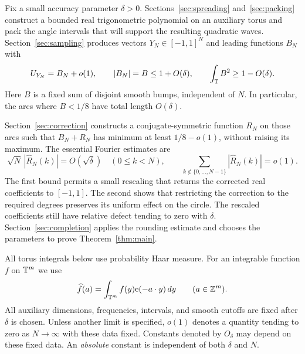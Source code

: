 Fix a small accuracy parameter $\delta>0$. Sections~\ref{sec:spreading}
and~\ref{sec:packing} construct a bounded real trigonometric polynomial
on an auxiliary torus and pack the angle intervals that will support
the resulting quadratic waves. Section~\ref{sec:sampling} produces vectors $Y_N\in[-1,1]^N$ and
leading functions $B_N$ with
\[
 U_{Y_N}=B_N+o(1),\qquad |B_N|=B\le1+O(\delta),\qquad
 \int_{\mathbb T}B^2\ge1-O(\delta).
\]
Here $B$ is a fixed sum of disjoint smooth bumps, independent of
$N$. In particular, the arcs where $B<1/8$ have total length $O(\delta)$.

Section~\ref{sec:correction} constructs a conjugate-symmetric function
$R_N$ on those arcs such that $B_N+R_N$ has minimum at least $1/8-o(1)$,
without raising its maximum. The essential Fourier estimates are
\[
 \sqrt N\,|\widehat R_N(k)|=O(\sqrt\delta)\quad(0\le k<N),
 \qquad
 \sum_{k\notin\{0,\ldots,N-1\}}|\widehat R_N(k)|=o(1).
\]
The first bound permits a small rescaling that returns the corrected real
coefficients to $[-1,1]$. The second shows that restricting the correction
to the required degrees preserves its uniform effect on the circle.
The rescaled coefficients still have relative defect tending to zero with
$\delta$. Section~\ref{sec:completion} applies the rounding estimate and
chooses the parameters to prove Theorem~\ref{thm:main}.

All torus integrals below use probability Haar measure. For an integrable
function $f$ on $\mathbb T^m$ we use
\[
 \widehat f(a)=\int_{\mathbb T^m}f(y)\mathrm e(-a\cdot y)\,dy
 \qquad(a\in\mathbb Z^m).
\]
All auxiliary dimensions, frequencies, intervals, and smooth cutoffs are
fixed after $\delta$ is chosen. Unless another limit is specified, $o(1)$
denotes a quantity tending to zero as $N\to\infty$ with these data fixed.
Constants denoted by $O_\delta$ may depend on these fixed data.
An \emph{absolute} constant is independent of both $\delta$ and $N$.
